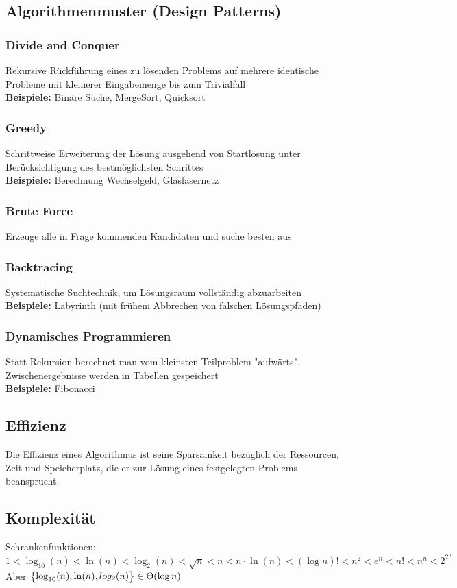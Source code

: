 \documentclass[fs, footer]{latex4ei}
\begin{document}
\begin{multicols*}{4}
\subsection{Algorithmenmuster (Design Patterns)}
\subsubsection{Divide and Conquer}
Rekursive Rückführung eines zu lösenden Problems auf mehrere identische Probleme mit kleinerer Eingabemenge bis zum Trivialfall\\
\textbf{Beispiele:} Binäre Suche, MergeSort, Quicksort
\subsubsection{Greedy}
Schrittweise Erweiterung der Lösung ausgehend von Startlösung unter Berücksichtigung des bestmöglichsten Schrittes\\
\textbf{Beispiele:} Berechnung Wechselgeld, Glasfasernetz
\subsubsection{Brute Force}
Erzeuge alle in Frage kommenden Kandidaten und suche besten aus\\
\subsubsection{Backtracing}
Systematische Suchtechnik, um Lösungsraum vollständig abzuarbeiten\\
\textbf{Beispiele:} Labyrinth (mit frühem Abbrechen von falschen Lösungspfaden)
\subsubsection{Dynamisches Programmieren}
Statt Rekursion berechnet man vom kleinsten Teilproblem "aufwärts". Zwischenergebnisse werden in Tabellen gespeichert\\
\textbf{Beispiele:} Fibonacci
\subsection{Effizienz}
Die Effizienz eines Algorithmus ist seine Sparsamkeit bezüglich der Ressourcen, Zeit und Speicherplatz, die er zur Lösung eines festgelegten Problems beansprucht.

\subsection{Komplexität}
Schrankenfunktionen:
$1<\log_{10}(n)<\ln(n)<\log_2(n)<\sqrt{n}<n<n\cdot \ln(n)<(\log n)! <n^2 < e^n < n! < n^n < 2^{2^n}$
Aber $\bigl\{\log_{10}(n), \ln (n), log_2 (n)\bigr\} \in \Theta(\log n)$


\end{multicols*}
\end{document}
